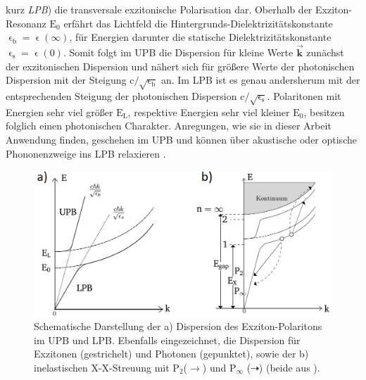 kurz \textit{LPB}) die \mbox{transversale} \mbox{exzitonische}
\mbox{Polarisation} dar. Oberhalb der Exziton-Resonanz $\text{E}_\text{0}$
erfährt das \mbox{Lichtfeld} die Hintergrunds-Dielektrizitätskonstante
$\upvarepsilon _\text{b}=\upvarepsilon (\infty)$, für Energien darunter die
\mbox{statische} Dielektrizitätskonstante $\upvarepsilon _\text{s}=\upvarepsilon
(\text{0})$. Somit folgt im UPB die Dispersion für \mbox{kleine} \mbox{Werte}
$\vec{\textbf{k}}$ zunächst der exzitonischen Dispersion und nähert sich für
größere Werte der \mbox{photonischen} Dispersion mit der Steigung
$\text{c}/\sqrt{\upvarepsilon _\text{b}}$ an. Im LPB ist es genau
\mbox{andersherum} mit der entsprechenden Steigung der photonischen Dispersion
$\text{c}/\sqrt{\upvarepsilon _\text{s}}$. Polaritonen mit Energien sehr viel
größer $\text{E}_\text{L}$, respektive Energien sehr viel kleiner
$\text{E}_\text{0}$, besitzen folglich einen photonischen Charakter. Anregungen,
wie sie in dieser Arbeit Anwendung finden, geschehen im UPB und können über
akustische oder optische Phononenzweige ins LPB relaxieren
\cite{Klingshirn.2007}.\\ \begin{figure}[htb] \centering
\includegraphics[width=.6\textwidth]{Bilder/Vorbetrachtung/PolScat}
\caption[Polaritonendispersion und inelastische X-X-Streuung]{Schematische
Darstellung der a) Dispersion des Exziton-Polaritons im UPB und LPB. Ebenfalls
eingezeichnet, die Dispersion für Exzitonen (gestrichelt) und Photonen
(gepunktet), sowie der b) inelastischen X-X-Streuung mit
P$_\text{2}$($\longrightarrow$) und P$_\infty$ ($\dashrightarrow$) (beide aus
\cite{Richters.Diss}).} \label{PolScat} \end{figure}
